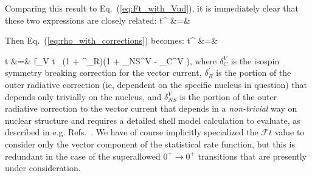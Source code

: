 Comparing this result to Eq.~(\ref{eq:Ft_with_Vud}), it is immediately clear that these two expressions are closely related:
\bea
{}t^{}
&=& 
\eea


%
%
%

\color{skyblue}
Then Eq.~(\ref{eq:rho_with_corrections}) becomes:
\bea
{}t^{} 
&=& 
\eea


\bea
{}t &=& f_V t \, (1 + \delta^\prime_R)(1 + \delta_{NS}^V - \delta_C^{V} ),
\label{eq:define_Ft}
\eea
where 
$\delta_C^{V}$ is the isospin symmetry breaking correction for the vector current, 
$\delta^\prime_R$ is the portion of the outer radiative correction (ie, dependent on the specific nucleus in question) that depends only trivially on the nucleus, 
and
$\delta_{NS}^{V}$ is the portion of the outer radiative correction %
to the vector current that depends in a \emph{non-trivial} way on nuclear structure and requires a detailed shell model calculation to evaluate, as described in e.g.  Refs.~\cite{TownerHardy2008}\cite{JausRasche1990}\cite{barker1992}\cite{Towner1992}\cite{Towner1994}.  
We have of course implicitly specialized the $\mathcal{F}t$ value to consider only the vector component of the statistical rate function, but this is redundant in the case of the superallowed $0^+ \rightarrow 0^+$ transitions that are presently under consideration.

